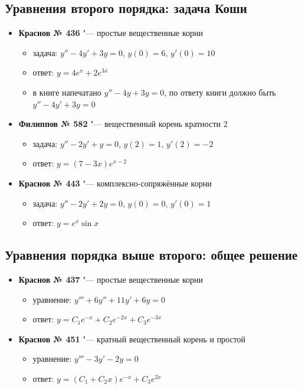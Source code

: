 \documentclass[11pt,a4paper]{article}
\begin{document}
\subsection*{Уравнения второго порядка: задача Коши}
\begin{itemize}[topsep=2pt]
  \item \textbf{Краснов № 436} "--- простые вещественные корни \quad{}
  \begin{itemize}
    \item задача: $y'' - 4y' + 3y = 0$, $y(0) = 6$, $y'(0) = 10$
    \item ответ: $y = 4e^{x} + 2e^{3x}$
    \item в книге напечатано $y'' - 4y + 3y = 0$, по ответу книги должно быть $y'' - 4y' + 3y = 0$
  \end{itemize}
  \item \textbf{Филиппов № 582} "--- вещественный корень кратности 2
  \begin{itemize}
    \item задача: $y'' - 2y' + y = 0$, $y(2) = 1$, $y'(2) = -2$
    \item ответ: $y = (7 - 3x)e^{x - 2}$
  \end{itemize}
  \item \textbf{Краснов № 443} "--- комплексно-сопряжённые корни
  \begin{itemize}
    \item задача: $y'' - 2y' + 2y = 0$, $y(0) = 0$, $y'(0) = 1$
    \item ответ: $y = e^{x}\sin x$
  \end{itemize}
\end{itemize}

\subsection*{Уравнения порядка выше второго: общее решение}
\begin{itemize}[topsep=2pt]
  \item \textbf{Краснов № 437} "--- простые вещественные корни
  \begin{itemize}
    \item уравнение: $y''' + 6y'' + 11y' + 6y = 0$
    \item ответ: $y = C_1 e^{-x} + C_2 e^{-2x} + C_3 e^{-3x}$
  \end{itemize}
  \item \textbf{Краснов № 451} "--- кратный вещественный корень и простой
  \begin{itemize}
    \item уравнение: $y''' - 3y' - 2y = 0$
    \item ответ: $y = (C_1 + C_2 x)e^{-x} + C_3 e^{2x}$
  \end{itemize}
\end{itemize}
\end{document}

